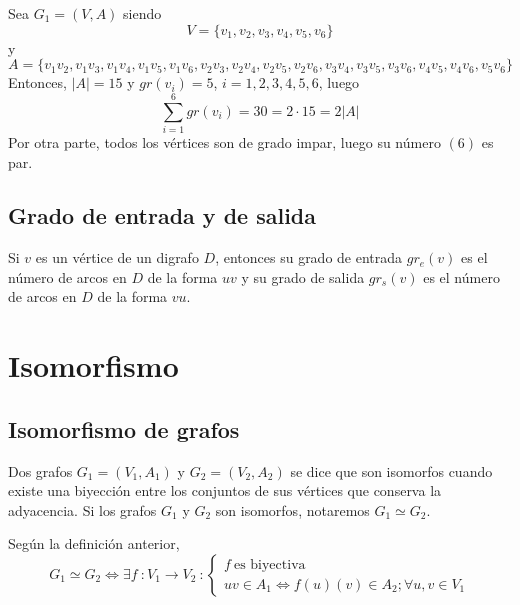Sea $G_1 = (V,A)$ siendo\\
\[ V = \{v_1,v_2,v_3,v_4,v_5,v_6\} \]
y\\
\[ A = \{v_1v_2,v_1v_3,v_1v_4,v_1v_5,v_1v_6,v_2v_3,v_2v_4,v_2v_5,v_2v_6,v_3v_4,v_3v_5,v_3v_6,v_4v_5,v_4v_6,v_5v_6\} \]
Entonces, $|A| = 15$ y $gr(v_i) = 5$, $i = 1,2,3,4,5,6$, luego
\[  \sum^{6}_{i=1}{gr(v_i) = 30 = 2 \cdot 15 = 2 |A|} \]
Por otra parte, todos los vértices son de grado impar, luego su número $(6)$ es par.\\

\subsection{Grado de entrada y de salida}

\begin{fondo}
Si $v$ es un vértice de un digrafo $D$, entonces su grado de entrada $gr_e(v)$ es el número de arcos en $D$ de la forma $uv$ y su grado de salida $gr_s(v)$ es el número de arcos en $D$ de la forma $vu$.
\end{fondo}

\section{Isomorfismo}

\subsection{Isomorfismo de grafos}

\begin{fondo}
Dos grafos $G_1 = (V_1,A_1)$ y $G_2 = (V_2,A_2)$ se dice que son isomorfos cuando existe una biyección entre los conjuntos de sus vértices que conserva la adyacencia. Si los grafos $G_1$ y $G_2$ son isomorfos, notaremos $G_1 \simeq G_2$.
\end{fondo}

Según la definición anterior,\\
\[ G_1 \simeq G_2 \iff \exists f\ : V_1 \rightarrow V_2\ : 
\left\{ 
  \begin{array}{l} 
    f\ \mbox{es biyectiva}  \\ 
    uv \in A_1 \iff f(u)(v) \in A_2; \forall u,v \in V_1
  \end{array} 
\right. \]

